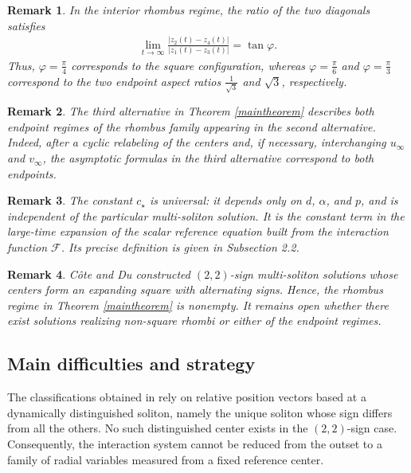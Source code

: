 \documentclass[10pt,a4paper]{amsart}
\newtheorem{remark}{Remark}[section]
\numberwithin{equation}{section}
\begin{document}
\begin{remark}
In the interior rhombus regime, the ratio of the two diagonals satisfies
\begin{align*}
\lim_{t\to\infty}\frac{|z_2(t)-z_4(t)|}{|z_1(t)-z_3(t)|}=\tan{\varphi}.
\end{align*}
Thus, $\varphi=\frac{\pi}{4}$ corresponds to the square configuration, whereas $\varphi=\frac{\pi}{6}$ and $\varphi=\frac{\pi}{3}$ correspond to the two endpoint aspect ratios $\frac{1}{\sqrt3}$ and $\sqrt3$, respectively.
\end{remark}



\begin{remark}
The third alternative in Theorem \ref{maintheorem} describes both endpoint regimes of the rhombus family appearing in the second alternative. Indeed, after a cyclic relabeling of the centers and, if necessary, interchanging $u_{\infty}$ and $v_{\infty}$, the asymptotic formulas in the third alternative correspond to both endpoints.
\end{remark}


\begin{remark}
The constant $c_{\star}$ is universal: it depends only on $d$, $\alpha$, and $p$, and is independent of the particular multi-soliton solution. It is the constant term in the large-time expansion of the scalar reference equation built from the interaction function $\mathcal F$. Its precise definition is given in Subsection 2.2.
\end{remark}

\begin{remark}
C\^{o}te and Du \cite{CD} constructed $(2,2)$-sign multi-soliton solutions whose centers form an expanding square with alternating signs. Hence, the rhombus regime in Theorem \ref{maintheorem} is nonempty. It remains open whether there exist solutions realizing non-square rhombi or either of the endpoint regimes.
\end{remark}

\subsection{Main difficulties and strategy}

The classifications obtained in \cite{I2,I3} rely on relative position vectors based at a dynamically distinguished soliton, namely the unique soliton whose sign differs from all the others. No such distinguished center exists in the $(2,2)$-sign case. Consequently, the interaction system cannot be reduced from the outset to a family of radial variables measured from a fixed reference center.
\end{document}
